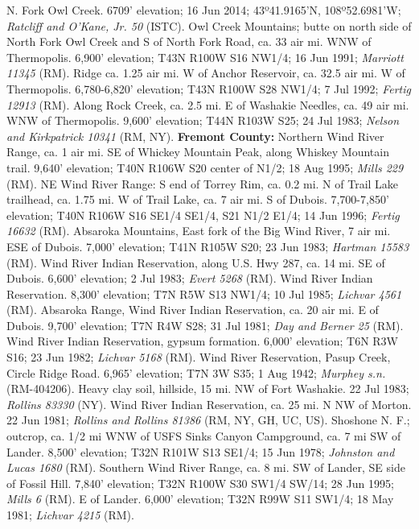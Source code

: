N. Fork Owl Creek. 6709' elevation; 16 Jun 2014; 43º41.9165'N, 108º52.6981'W;
\textit{Ratcliff and O'Kane, Jr. 50} (ISTC).
Owl Creek Mountains; butte on north side of North Fork Owl Creek and S of
North Fork Road, ca. 33 air mi. WNW of Thermopolis. 6,900' elevation;
T43N R100W S16 NW1/4; 16 Jun 1991; \textit{Marriott 11345} (RM).
Ridge ca. 1.25 air mi. W of Anchor Reservoir, ca. 32.5 air mi. W of Thermopolis.
6,780-6,820' elevation; T43N R100W S28 NW1/4; 7 Jul 1992;
\textit{Fertig 12913} (RM).
Along Rock Creek, ca. 2.5 mi. E of Washakie Needles, ca. 49 air mi. WNW of
Thermopolis. 9,600' elevation; T44N R103W S25; 24 Jul 1983;
\textit{Nelson and Kirkpatrick 10341} (RM, NY).
  \textbf{Fremont County:}
Northern Wind River Range, ca. 1 air mi. SE of Whickey Mountain Peak, along
Whiskey Mountain trail. 9,640' elevation; T40N R106W S20 center of N1/2;
18 Aug 1995; \textit{Mills 229} (RM).
NE Wind River Range: S end of Torrey Rim, ca. 0.2 mi. N of Trail Lake trailhead,
ca. 1.75 mi. W of Trail Lake, ca. 7 air mi. S of Dubois. 7,700-7,850' elevation;
T40N R106W S16 SE1/4 SE1/4, S21 N1/2 E1/4; 14 Jun 1996;
\textit{Fertig 16632} (RM).
Absaroka Mountains, East fork of the Big Wind River, 7 air mi. ESE of Dubois.
7,000' elevation; T41N R105W S20; 23 Jun 1983; \textit{Hartman 15583} (RM).
Wind River Indian Reservation, along U.S. Hwy 287, ca. 14 mi. SE of Dubois.
6,600' elevation; 2 Jul 1983; \textit{Evert 5268} (RM).
Wind River Indian Reservation. 8,300' elevation; T7N R5W S13 NW1/4; 10 Jul 1985;
\textit{Lichvar 4561} (RM).
Absaroka Range, Wind River Indian Reservation, ca. 20 air mi. E of Dubois.
9,700' elevation; T7N R4W S28; 31 Jul 1981; \textit{Day and Berner 25} (RM).
Wind River Indian Reservation, gypsum formation. 6,000' elevation; T6N R3W S16;
23 Jun 1982; \textit{Lichvar 5168} (RM).
Wind River Reservation, Pasup Creek, Circle Ridge Road. 6,965' elevation;
T7N 3W S35; 1 Aug 1942; \textit{Murphey s.n.} (RM-404206).
Heavy clay soil, hillside, 15 mi. NW of Fort Washakie. 22 Jul 1983;
\textit{Rollins 83330} (NY).
Wind River Indian Reservation, ca. 25 mi. N NW of Morton. 22 Jun 1981;
\textit{Rollins and Rollins 81386} (RM, NY, GH, UC, US).
Shoshone N. F.; outcrop, ca. 1/2 mi WNW of USFS Sinks Canyon Campground, ca.
7 mi SW of Lander. 8,500' elevation; T32N R101W S13 SE1/4; 15 Jun 1978;
\textit{Johnston and Lucas 1680} (RM).
Southern Wind River Range, ca. 8 mi. SW of Lander, SE side of Fossil Hill.
7,840' elevation; T32N R100W S30 SW1/4 SW/14; 28 Jun 1995;
\textit{Mills 6} (RM).
E of Lander. 6,000' elevation; T32N R99W S11 SW1/4; 18 May 1981;
\textit{Lichvar 4215} (RM).
